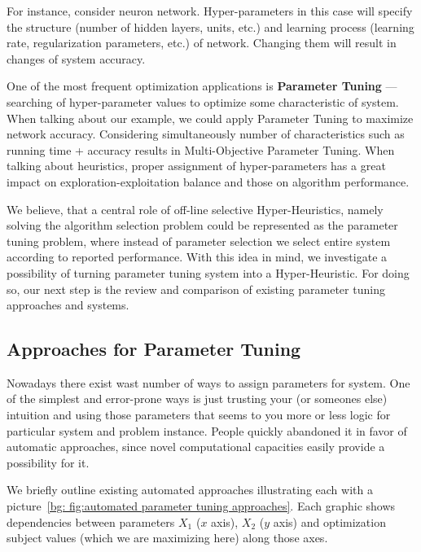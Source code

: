 For instance, consider neuron network. Hyper-parameters in this case will specify the structure (number of hidden layers, units, etc.) and learning process (learning rate, regularization parameters, etc.) of network. Changing them will result in changes of system accuracy.


One of the most frequent optimization applications is \textbf{Parameter Tuning} — searching of hyper-parameter values to optimize some characteristic of system. When talking about our example, we could apply Parameter Tuning to maximize network accuracy. Considering simultaneously number of characteristics such as running time + accuracy results in Multi-Objective Parameter Tuning.
When talking about heuristics, proper assignment of hyper-parameters has a great impact on exploration-exploitation balance and those on algorithm performance.


We believe, that a central role of off-line selective Hyper-Heuristics, namely solving the algorithm selection problem could be represented as the parameter tuning problem, where instead of parameter selection we select entire system according to reported performance. With this idea in mind, we investigate a possibility of turning parameter tuning system into a Hyper-Heuristic.
For doing so, our next step is the review and comparison of existing parameter tuning approaches and systems. 


\subsection{Approaches for Parameter Tuning}
Nowadays there exist wast number of ways to assign parameters for system. 
One of the simplest and error-prone ways is just trusting your (or someones else) intuition and using those parameters that seems to you more or less logic for particular system and problem instance. People quickly abandoned it in favor of automatic approaches, since novel computational capacities easily provide a possibility for it.

We briefly outline existing automated approaches illustrating each with a picture~\ref{bg: fig:automated parameter tuning approaches}. Each graphic shows dependencies between parameters $X_1$ ($x$ axis), $X_2$ ($y$ axis) and optimization subject values (which we are maximizing here) along those axes.

